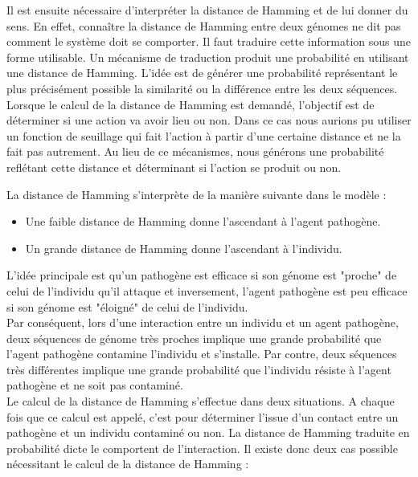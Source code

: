 Il est ensuite nécessaire d'interpréter la distance de Hamming et de lui donner du sens. En effet, connaître la distance de Hamming entre deux génomes ne dit pas comment le système doit se comporter. Il faut traduire cette information sous une forme utilisable. Un mécanisme de traduction produit une probabilité en utilisant une distance de Hamming. L'idée est de générer une probabilité représentant le plus précisément possible la similarité ou la différence entre les deux séquences. Lorsque le calcul de la distance de Hamming est demandé, l'objectif est de déterminer si une action va avoir lieu ou non. Dans ce cas nous aurions pu utiliser un fonction de seuillage qui fait l'action à partir d'une certaine distance et ne la fait pas autrement. Au lieu de ce mécanismes, nous générons une probabilité reflétant cette distance et déterminant si l'action se produit ou non.

La distance de Hamming s’interprète de la manière suivante dans le modèle :\\

\begin{itemize}
	\item Une faible distance de Hamming donne l'ascendant à l'agent pathogène.
	\item Un grande distance de Hamming donne l'ascendant à l'individu.
\end{itemize}

L'idée principale est qu'un pathogène est efficace si son génome est "proche" de celui de l'individu qu'il attaque et inversement, l'agent pathogène est peu efficace si son génome est "éloigné" de celui de l'individu.\\

Par conséquent, lors d'une interaction entre un individu et un agent pathogène, deux séquences de génome très proches implique une grande probabilité que l'agent pathogène contamine l'individu et s'installe. Par contre, deux séquences très différentes implique une grande probabilité que l'individu résiste à l'agent pathogène et ne soit pas contaminé.\\

Le calcul de la distance de Hamming s'effectue dans deux situations. A chaque fois que ce calcul est appelé, c'est pour déterminer l'issue d'un contact entre un pathogène et un individu contaminé ou non. La distance de Hamming traduite en probabilité dicte le comportent de l’interaction. Il existe donc deux cas possible nécessitant le calcul de la distance de Hamming :

